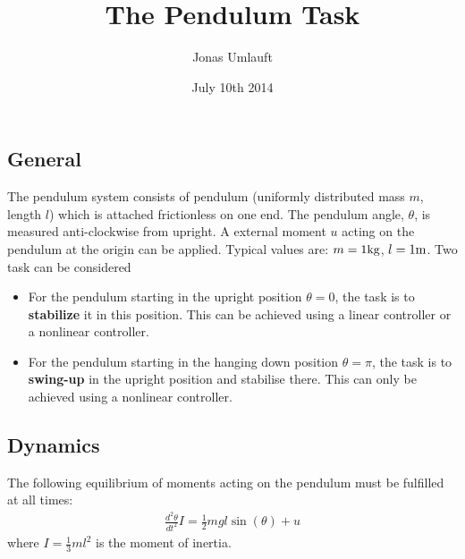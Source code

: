 \documentclass{article}
\title{The Pendulum Task}
\author{Jonas Umlauft}
\date{July 10th 2014}
\begin{document}
\maketitle
\begin{center}
\end{center}
\subsection*{General}
The pendulum system consists of pendulum (uniformly distributed mass $m$, length $l$) which is attached frictionless on one end. The pendulum angle, $\theta$, is measured anti-clockwise
from upright. A external moment $u$ acting on the pendulum at the origin can be applied. Typical values are: $m=1{\rm kg}$,  $l=1{\rm m}$.
Two task can be considered
\begin{itemize}
\item For the pendulum starting in the upright position $ \theta =0$, the task is to \textbf{stabilize} it in this position. 
		This can be achieved using a linear controller or a nonlinear controller.
\item For the pendulum starting  in the hanging down position $ \theta =\pi$, the task is to \textbf{swing-up} in the upright position and stabilise there. 
	 This can only be achieved using a nonlinear controller.
\end{itemize}


\subsection*{Dynamics}
The following equilibrium of moments acting on the pendulum must be fulfilled at all times:
\begin{align*}
\frac{d^2 \theta}{dt^2}I = \frac{1}{2} mgl\sin (\theta) +u
\end{align*}
where $I = \tfrac{1}{3} ml^2$ is the moment of inertia.
\end{document}
